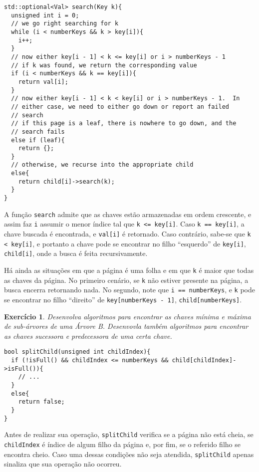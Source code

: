 \documentclass[11pt]{article}
\newtheorem{exercicio}{Exercício}
\begin{document}
\begin{verbatim}
std::optional<Val> search(Key k){
  unsigned int i = 0;
  // we go right searching for k
  while (i < numberKeys && k > key[i]){
    i++;
  }
  // now either key[i - 1] < k <= key[i] or i > numberKeys - 1
  // if k was found, we return the corresponding value
  if (i < numberKeys && k == key[i]){
    return val[i];
  }
  // now either key[i - 1] < k < key[i] or i > numberKeys - 1.  In
  // either case, we need to either go down or report an failed
  // search
  // if this page is a leaf, there is nowhere to go down, and the
  // search fails
  else if (leaf){
    return {};
  }
  // otherwise, we recurse into the appropriate child
  else{
    return child[i]->search(k);
  }
}
\end{verbatim}

A função \texttt{search} admite que as chaves estão armazenadas em ordem
crescente, e assim faz \texttt{i} assumir o menor índice tal que \texttt{k <=
    key[i]}.  Caso \texttt{k == key[i]}, a chave buscada é encontrada, e
\texttt{val[i]} é retornado.  Caso contrário, sabe-se que \texttt{k < key[i]}, e
portanto a chave pode se encontrar no filho ``esquerdo'' de
\texttt{key[i]}, \texttt{child[i]}, onde a busca é feita recursivamente.

Há ainda as situações em que a página é uma folha e em que \texttt{k} é
maior que todas as chaves da página.  No primeiro cenário, se \texttt{k}
não estiver presente na página, a busca encerra retornando nada.
No segundo, note que \texttt{i == numberKeys}, e \texttt{k} pode se encontrar no
filho ``direito'' de \texttt{key[numberKeys - 1]}, \texttt{child[numberKeys]}.

\begin{exercicio}
Desenvolva algoritmos para encontrar as chaves mínima e máxima de
sub-árvores de uma Árvore B.  Desenvovla também algoritmos para
encontrar as chaves sucessora e predecessora de uma certa chave.
\end{exercicio}

\pagebreak

\begin{verbatim}
bool splitChild(unsigned int childIndex){
  if (!isFull() && childIndex <= numberKeys && child[childIndex]->isFull()){
    // ...
  }
  else{
    return false;
  }
}
\end{verbatim}

Antes de realizar sua operação, \texttt{splitChild} verifica se a página
não está cheia, se \texttt{childIndex} é índice de algum filho da página
e, por fim, se o referido filho se encontra cheio.  Caso uma
dessas condições não seja atendida, \texttt{splitChild} apenas sinaliza
que sua operação não ocorreu.
\end{document}
